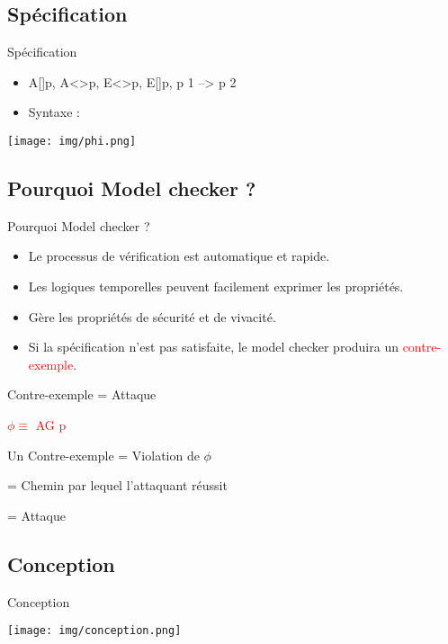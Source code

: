 \documentclass[11pt]{beamer}
\begin{document}
\subsection{Spécification}
\begin{frame}{Spécification}
\begin{itemize}
\item A[]p, A<>p, E<>p, E[]p, p 1 --> p 2
\item Syntaxe :
\end{itemize}
\begin{center}
\texttt{[image: img/phi.png]} 
\end{center}
\end{frame}


\subsection{Pourquoi Model checker ?}
\begin{frame}{Pourquoi Model checker ?}
\begin{itemize}
\item Le processus de vérification est automatique et rapide.
\item Les logiques temporelles peuvent facilement exprimer les propriétés.
\item Gère les propriétés de sécurité et de vivacité.
\item Si la spécification n'est pas satisfaite, le model checker produira un \textcolor{red}{contre-exemple}.
\end{itemize}
\end{frame}
\begin{frame}{Contre-exemple = Attaque}
\begin{center}
\huge \textcolor{red}{$\phi \equiv$ AG p}
\end{center}
\medskip

\pause
Un Contre-exemple = Violation de $\phi$\medskip

\pause
\quad\quad\quad\quad\quad\quad\quad\quad\:= Chemin par lequel l'attaquant réussit\medskip

\pause				  
\quad\quad\quad\quad\quad\quad\quad\quad\:= Attaque	

\end{frame}


\subsection{Conception}
\begin{frame}{Conception}
\vspace{-30pt}
\begin{center}
\texttt{[image: img/conception.png]} 
\end{center}
\end{frame}
\end{document}
